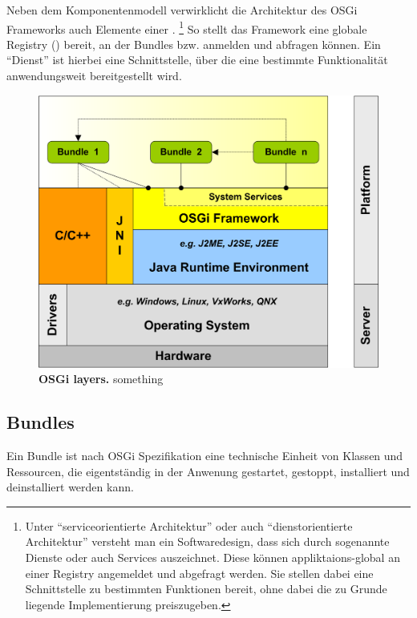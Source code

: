 Neben dem Komponentenmodell verwirklicht die Architektur des OSGi Frameworks
auch Elemente einer .
\footnote{Unter \enquote{serviceorientierte Architektur} oder auch
\enquote{dienstorientierte Architektur} versteht man ein Softwaredesign, dass
sich durch sogenannte Dienste oder auch Services auszeichnet. Diese können
appliktaions-global an einer Registry angemeldet und abgefragt werden.
Sie stellen dabei eine Schnittstelle zu bestimmten Funktionen bereit, ohne
dabei die zu Grunde liegende Implementierung preiszugeben.}
So stellt das Framework eine globale Registry ()
bereit, an der Bundles  bzw.  anmelden und
abfragen können.
Ein \enquote{Dienst} ist hierbei eine Schnittstelle,
über die eine bestimmte Funktionalität anwendungsweit bereitgestellt wird.
\citep{wtherich_die_2008}

\begin{figure}[p]
	\begin{center}
		\includegraphics[scale=2]{pics/osgi_layer.png}
	\caption[OSGi layers]{
	\textbf{OSGi layers.}
	something}
	\end{center}
	\label{fig:osgi_layer}
\end{figure}

\subsection{Bundles}
Ein Bundle ist nach OSGi Spezifikation\citep{osgi_2009} eine technische Einheit
von Klassen und Ressourcen, die eigentständig in der Anwenung gestartet,
gestoppt, installiert und deinstalliert werden kann.

